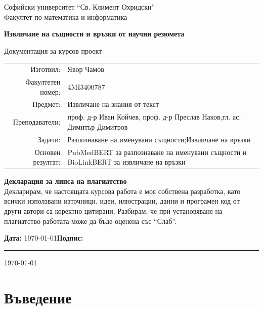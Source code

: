 \documentclass[12pt,a4paper]{article}
\begin{document}
\begin{titlepage}
\centering
\vspace*{1.2cm}
{\Large Софийски университет ``Св. Климент Охридски''\\[0.2cm]}
{\large Факултет по математика и информатика\\[1.2cm]}

{\Huge\bfseries Извличане на същности и връзки от научни резюмета\\[0.6cm]}

{\Large Документация за курсов проект\\[1.2cm]}

\begin{tabular}{r >{\raggedright\arraybackslash}p{10.5cm}}
Изготвил: & Явор Чамов \\
Факултетен номер: & 4MI3400787 \\
Предмет: & Извличане на знания от текст \\
Преподаватели: & проф. д-р Иван Койчев, проф. д-р Преслав Наков,\newline гл. ас. Димитър Димитров \\
Задачи: & Разпознаване на именувани същности;\newline Извличане на връзки \\
Основен резултат: & PubMedBERT за разпознаване на именувани същности и BioLinkBERT за извличане на връзки \\
\end{tabular}

\vspace{1.2cm}

\noindent \textbf{Декларация за липса на плагиатство}\\[0.2cm]
Декларирам, че настоящата курсова работа е моя собствена разработка, като всички използвани източници, идеи, илюстрации, данни и програмен код от други автори са коректно цитирани. Разбирам, че при установяване на плагиатство работата може да бъде оценена със ``Слаб''.

\vspace{1.0cm}

\noindent \textbf{Дата:} \today \hfill \textbf{Подпис:} \rule{4cm}{0.4pt}

\vfill
{\large \today}

\end{titlepage}

\tableofcontents
\newpage

\section{Въведение}
\end{document}
